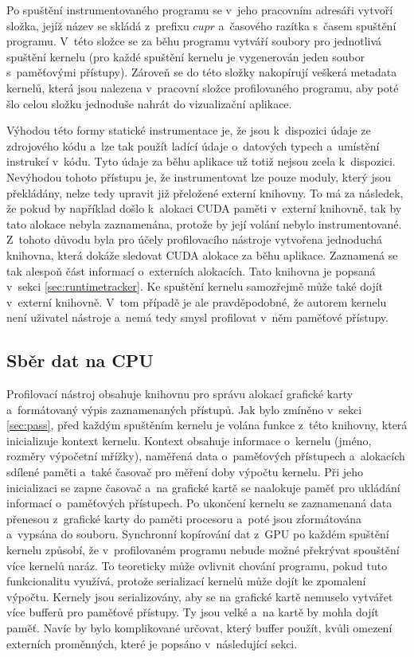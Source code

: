 Po spuštění instrumentovaného programu se v~jeho pracovním adresáři vytvoří složka, jejíž název se skládá z~prefixu $cupr$ a~časového razítka s~časem spuštění programu. V~této složce se za běhu programu vytváří soubory pro jednotlivá spuštění kernelu (pro každé spuštění kernelu je vygenerován jeden soubor s~paměťovými přístupy). Zároveň se do této složky nakopírují veškerá metadata kernelů, která jsou nalezena v~pracovní složce profilovaného programu, aby poté šlo celou složku jednoduše nahrát do vizualizační aplikace.  

Výhodou této formy statické instrumentace je, že jsou k~dispozici údaje ze zdrojového kódu a~lze tak použít ladící údaje o~datových typech a~umístění instrukcí v~kódu. Tyto údaje za běhu aplikace už totiž nejsou zcela k~dispozici. Nevýhodou tohoto přístupu je, že instrumentovat lze pouze moduly, který jsou překládány, nelze tedy upravit již přeložené externí knihovny. To má za následek, že pokud by například došlo k~alokaci CUDA paměti v~externí knihovně, tak by tato alokace nebyla zaznamenána, protože by její volání nebylo instrumentované. Z~tohoto důvodu byla pro účely profilovacího nástroje vytvořena jednoduchá knihovna, která dokáže sledovat CUDA alokace za běhu aplikace. Zaznamená se tak alespoň část informací o~externích alokacích. Tato knihovna je popsaná v~sekci \ref{sec:runtimetracker}. Ke spuštění kernelu samozřejmě může také dojít v~externí knihovně. V~tom případě je ale pravděpodobné, že autorem kernelu není uživatel nástroje a~nemá tedy smysl profilovat v~něm paměťové přístupy.
    
\subsection{Sběr dat na CPU}
\label{sec:cpucollection}
Profilovací nástroj obsahuje knihovnu pro správu alokací grafické karty a~formátovaný výpis zaznamenaných přístupů. Jak bylo zmíněno v~sekci \ref{sec:pass}, před každým spuštěním kernelu je volána funkce z~této knihovny, která inicializuje kontext kernelu. Kontext obsahuje informace o~kernelu (jméno, rozměry výpočetní mřížky), naměřená data o~paměťových přístupech a~alokacích sdílené paměti a~také časovač pro měření doby výpočtu kernelu. Při jeho inicializaci se zapne časovač a~na grafické kartě se naalokuje paměť pro ukládání informací o~paměťových přístupech. Po ukončení kernelu se zaznamenaná data přenesou z~grafické karty do paměti procesoru a~poté jsou zformátována a~vypsána do souboru. 
Synchronní kopírování dat z~GPU po každém spuštění kernelu způsobí, že v~profilovaném programu nebude možné překrývat spouštění více kernelů naráz. To teoreticky může ovlivnit chování programu, pokud tuto funkcionalitu využívá, protože serializací kernelů může dojít ke zpomalení výpočtu. Kernely jsou serializovány, aby se na grafické kartě nemuselo vytvářet více bufferů pro paměťové přístupy. Ty jsou velké a~na kartě by mohla dojít paměť. Navíc by bylo komplikované určovat, který buffer použít, kvůli omezení externích proměnných, které je popsáno v~následující sekci.

